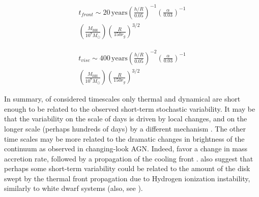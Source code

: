 \documentclass[twocolumn]{aastex62}
\begin{document}
  \begin{eqnarray}
  t_{front} {\sim} 20 \,\mathrm{years} \left( \frac{h/R}{0.05}\right)^{-1}   \left( \frac{\alpha}{0.03}\right)^{-1}  \nonumber  \\ 
  \left( \frac{M_{\mathrm{BH}}}{10^{8} M_{\odot}}\right)     \left( \frac{R}{150 r_{g}}\right) ^{3/2} 
 \end{eqnarray}

  \begin{eqnarray}
  t_{visc}  {\sim} 400 \, \mathrm{years} \left( \frac{h/R}{0.05}\right)^{-2}   \left( \frac{\alpha}{0.03}\right)^{-1} \nonumber  \\  
  \left(\frac{M_{\mathrm{BH}}}{10^{8} M_{\odot}} \right)     \left( \frac{R}{150 r_{g}}\right) ^{3/2}  
 \end{eqnarray}


In summary,  of  considered timescales only thermal and dynamical are short enough to be related to  the observed short-term stochastic variability. It may be that the variability on the scale of days is driven by local changes, and on the longer scale (perhaps hundreds of days) by a different mechanism \citep{kokubo2015}. The other time scales may be more related to the dramatic changes in brightness of the continuum as observed in changing-look AGN. Indeed, \citet{noda2018} favor a change in mass accretion rate, followed by a propagation of the cooling front \citep{lawrence2018, simm2016}. \citet{noda2018} also suggest that perhaps some short-term variability could be related to the amount of the disk swept by the thermal front propagation due to Hydrogen ionization instability, similarly to white dwarf systems (also, see \citealt{ruan2019, ross2018, sniegowska2019}). 
\end{document}
